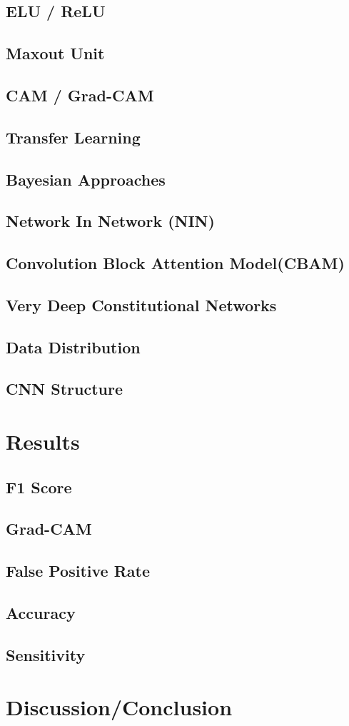 \documentclass[acmsmall, review]{acmart}
\begin{document}
\subsection{ELU / ReLU}
\subsection{Maxout Unit}
\subsection{CAM / Grad-CAM}
\subsection{Transfer Learning}
\subsection{Bayesian Approaches}
\subsection{Network In Network (NIN)}
\subsection{Convolution Block Attention Model(CBAM)}
\subsection{Very Deep Constitutional Networks}
\subsection{Data Distribution}
\subsection{CNN Structure}


\section{Results}
\subsection{F1 Score}
\subsection{Grad-CAM}
\subsection{False Positive Rate}
\subsection{Accuracy}
\subsection{Sensitivity}
\section{Discussion/Conclusion}
\end{document}
